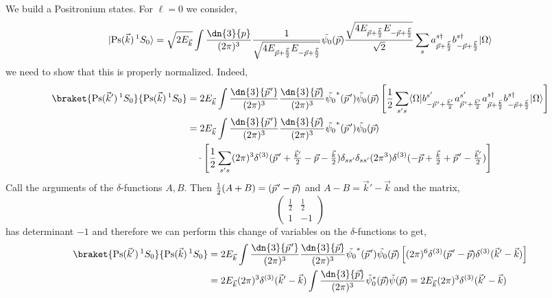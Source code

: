 \documentclass[12pt]{article}
\DeclarePairedDelimiter\bra{\langle}{\rvert}
\DeclarePairedDelimiter\ket{\lvert}{\rangle}
\newcommand{\pvec}[1]{\vec{#1}\mkern2mu\vphantom{#1}}
\begin{document}
We build a Positronium states. For $\ell = 0$ we consider,
\[ \ket{\text{Ps}(\vec{k}) \, {}^{1} S_0} = \sqrt{2 E_{\vec{k}}} \int \frac{\dn{3}{p}}{(2 \pi)^3} \frac{1}{\sqrt{4 E_{\vec{p} + \frac{\vec{k}}{2}} E_{-\vec{p} + \frac{\vec{k}}{2}}}} \tilde{\psi_0}(\vec{p}) \frac{\sqrt{4 E_{\vec{p} + \frac{\vec{k}}{2}} E_{-\vec{p} + \frac{\vec{k}}{2}}}}{\sqrt{2}} \sum_s a_{\vec{p} + \frac{\vec{k}}{2}}^{s \dagger} b_{-\vec{p} + \frac{\vec{k}}{2}}^{s \dagger} \ket{\Omega}   \]
we need to show that this is properly normalized. Indeed,
\begin{align*}
\braket{\text{Ps}(\vec{k}') \, {}^{1} S_0}{\text{Ps}(\vec{k}) \, {}^{1} S_0 } & = 2 E_{\vec{k}} \int \frac{\dn{3}{\pvec{p}'}}{(2 \pi)^3} \frac{\dn{3}{\vec{p}}}{(2 \pi)^3} \tilde{\psi_0}^*(\pvec{p}') \tilde{\psi_0}(\vec{p}) \left[ \frac{1}{2} \sum_{s's} \bra{\Omega}  b_{-\pvec{p}' + \frac{\vec{k}'}{2}}^{s'} a_{\pvec{p}' + \frac{\vec{k}'}{2}}^{s'} a_{\vec{p} + \frac{\vec{k}}{2}}^{s \dagger} b_{-\vec{p} + \frac{\vec{k}}{2}}^{s \dagger} \ket{\Omega} \right]
\\
& = 2 E_{\vec{k}} \int \frac{\dn{3}{\pvec{p}'}}{(2 \pi)^3} \frac{\dn{3}{\vec{p}}}{(2 \pi)^3} \tilde{\psi_0}^*(\pvec{p}') \tilde{\psi_0}(\vec{p})
\\
& \quad \cdot \left[ \frac{1}{2} \sum_{s's} (2 \pi)^3 \delta^{(3)}(\pvec{p}' + \tfrac{\vec{k}'}{2} - \vec{p} - \tfrac{\vec{k}}{2}) \delta_{ss'} \delta_{ss'} (2 \pi^3) \delta^{(3)}(-\vec{p} + \tfrac{\vec{k}}{2} + \pvec{p}' - \tfrac{\vec{k}'}{2}) \right]
\end{align*}
Call the arguments of the $\delta$-functions $A,B$. Then $\tfrac{1}{2}(A + B) = (\pvec{p}' - \vec{p})$ and $A - B = \vec{k}' - \vec{k}$ and the matrix,
\[ \begin{pmatrix}
\tfrac{1}{2} & \tfrac{1}{2}
\\
1 & -1
\end{pmatrix} \]
has determinant $-1$ and therefore we can perform this change of variables on the $\delta$-functions to get,
\begin{align*}
\braket{\text{Ps}(\vec{k}') \, {}^{1} S_0}{\text{Ps}(\vec{k}) \, {}^{1} S_0 } 
& = 2 E_{\vec{k}} \int \frac{\dn{3}{\pvec{p}'}}{(2 \pi)^3} \frac{\dn{3}{\vec{p}}}{(2 \pi)^3} \tilde{\psi_0}^*(\pvec{p}') \tilde{\psi_0}(\vec{p}) \left[ (2 \pi)^6 \delta^{(3)}(\pvec{p}' - \vec{p})  \delta^{(3)}(\vec{k}'-\vec{k}) \right]
\\
& = 2 E_{\vec{k}} (2 \pi)^3 \delta^{(3)}(\vec{k}' - \vec{k}) \int \frac{\dn{3}{\vec{p}}}{(2 \pi)^3} \tilde{\psi}_0^*(\vec{p}) \tilde{\psi}(\vec{p}) = 2 E_{\vec{k}} (2 \pi)^3 \delta^{(3)}(\vec{k}' - \vec{k})
\end{align*}
\end{document}
